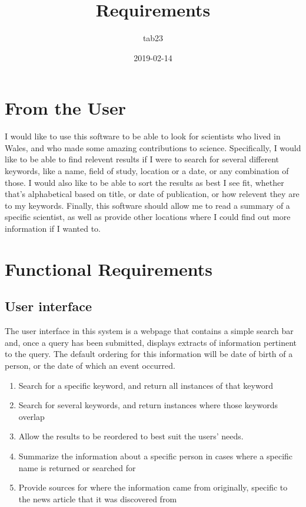 \documentclass[11pt,a4paper]{article}
\title{Requirements}
\author{tab23}
\date{2019-02-14}
\begin{document}
\maketitle


\section{From the User}
I would like to use this software to be able to look for scientists who lived in Wales, and who made some amazing contributions to science. Specifically, I would like to be able to find relevent results if I were to search for several different keywords, like a name, field of study, location or a date, or any combination of those. I would also like to be able to sort the results as best I see fit, whether that's alphabetical based on title, or date of publication, or how relevent they are to my keywords. Finally, this software should allow me to read a summary of a specific scientist, as well as provide other locations where I could find out more information if I wanted to. 

\section{Functional Requirements}
	\subsection{User interface}
		The user interface in this system is a webpage that contains a simple search bar and, once a query has been submitted, displays extracts of information pertinent to the query. The default ordering for this information will be date of birth of a person, or the date of which an event occurred.
		\begin{enumerate}
			\item Search for a specific keyword, and return all instances of that keyword
			\item Search for several keywords, and return instances where those keywords overlap
			\item Allow the results to be reordered to best suit the users' needs. 
			\item Summarize the information about a specific person in cases where a specific name is returned or searched for
			\item Provide sources for where the information came from originally, specific to the news article that it was discovered from
		\end{enumerate}
\end{document}

